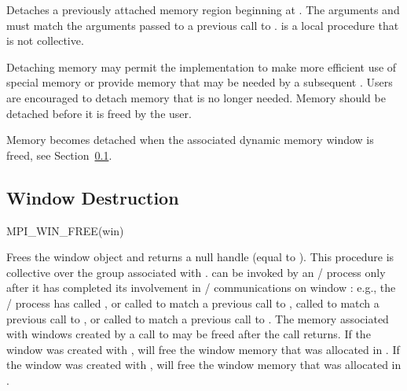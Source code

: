Detaches a previously attached memory region beginning at
. The arguments  and 
must match the arguments passed to a previous call to
.
 is a local procedure that is not collective.


\begin{users}
Detaching memory may permit the implementation to make more
efficient use of special memory or provide memory that may be needed
by a subsequent .  Users are encouraged to
detach memory that is no longer needed.
Memory should be detached before it is freed by the user.
\end{users}

Memory becomes detached when the associated dynamic memory window is
freed, see Section~\ref{sec:rma-win-free}.

\subsection{Window Destruction}
\label{sec:rma-win-free}

%
\begin{funcdef}{MPI\_WIN\_FREE}{(\mbox{win})}
\end{funcdef}

Frees the window object  and returns a null handle
(equal to ).
This procedure is collective over the group
associated with .  can be
invoked by an \mpi/ process only after it has completed its involvement in
\RMA/ communications on window : e.g., the \mpi/ process has
called , or called
 to match a previous call to
, called  to
match a previous call to , or called
 to match a previous call to
.
The
memory associated with windows created by a call to
 may be freed after the call returns.
If the
window was created with ,
 will free the window memory that was allocated
in .
If the
window was created with ,
 will free the window memory that was allocated
in .

